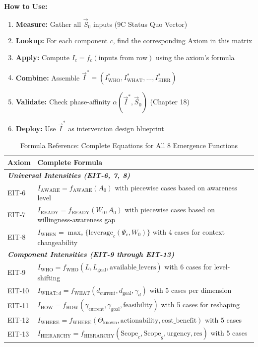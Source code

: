 \textbf{How to Use:}
\begin{enumerate}[nosep]
\item \textbf{Measure:} Gather all $\vec{S}_0$ inputs (9C Status Quo Vector)
\item \textbf{Lookup:} For each component $c$, find the corresponding Axiom in this matrix
\item \textbf{Apply:} Compute $I_c = f_c(\text{inputs from row})$ using the axiom's formula
\item \textbf{Combine:} Assemble $\vec{I}^* = (I_{\text{WHO}}^*, I_{\text{WHAT}}^*, \ldots, I_{\text{HIER}}^*)$
\item \textbf{Validate:} Check phase-affinity $\alpha(\vec{I}^*, \vec{S}_0)$ (Chapter 18)
\item \textbf{Deploy:} Use $\vec{I}^*$ as intervention design blueprint
\end{enumerate}


\begin{table}[htbp]
\centering
\caption{Formula Reference: Complete Equations for All 8 Emergence Functions}
\label{tab:ie-formulas}
\footnotesize
\renewcommand{\arraystretch}{2}
\begin{tabular}{@{}lp{8cm}@{}}
\toprule
\textbf{Axiom} & \textbf{Complete Formula} \\
\midrule
\multicolumn{2}{l}{\textit{\textbf{Universal Intensities (EIT-6, 7, 8)}}} \\
\midrule
EIT-6 & $I_{\text{AWARE}} = f_{\text{AWARE}}(A_0)$ with piecewise cases based on awareness level \\
EIT-7 & $I_{\text{READY}} = f_{\text{READY}}(W_0, A_0)$ with piecewise cases based on willingness-awareness gap \\
EIT-8 & $I_{\text{WHEN}} = \max_c \{\text{leverage}_c(\Psi_c, W_0)\}$ with 4 cases for context changeability \\
\midrule
\multicolumn{2}{l}{\textit{\textbf{Component Intensities (EIT-9 through EIT-13)}}} \\
\midrule
EIT-9 & $I_{\text{WHO}} = f_{\text{WHO}}(L, L_{\text{goal}}, \text{available\_levers})$ with 6 cases for level-shifting \\
EIT-10 & $I_{\text{WHAT}:d} = f_{\text{WHAT}}(d_{\text{current}}, d_{\text{goal}}, \gamma_d)$ with 5 cases per dimension \\
EIT-11 & $I_{\text{HOW}} = f_{\text{HOW}}(\gamma_{\text{current}}, \gamma_{\text{goal}}, \text{feasibility})$ with 5 cases for reshaping \\
EIT-12 & $I_{\text{WHERE}} = f_{\text{WHERE}}(\Theta_{\text{known}}, \text{actionability}, \text{cost\_benefit})$ with 5 cases \\
EIT-13 & $I_{\text{HIERARCHY}} = f_{\text{HIERARCHY}}(\text{Scope}_c, \text{Scope}_g, \text{urgency}, \text{res})$ with 5 cases \\
\bottomrule
\end{tabular}
\end{table}

